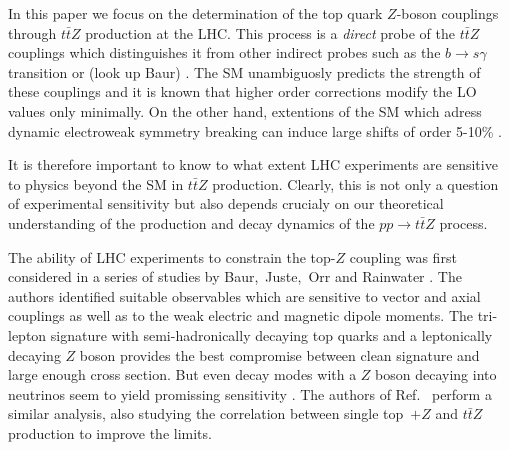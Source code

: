 \documentclass[preprint]{JHEP3} %
\def\ttbZ{t\bar{t}Z}
\begin{document}
In this paper we focus on the determination of the top quark $Z$-boson couplings through $\ttbZ$ production at the LHC. 
This process is a {\it direct} probe of the $\ttbZ$ couplings which distinguishes it from other indirect probes such as the $b \to s\gamma$ transition \cite{} 
or (look up Baur) \cite{}. 
The SM unambiguosly predicts the strength of these couplings and it is known that higher order corrections modify the LO values only minimally.
On the other hand, extentions of the SM which adress dynamic electroweak symmetry breaking can induce large shifts of order 5-10\% \cite{see-inside-LMMP}.

% 

It is therefore important to know to what extent LHC experiments are sensitive to physics beyond the SM in $\ttbZ$ production.
Clearly, this is not only a question of experimental sensitivity but also depends crucialy on our theoretical understanding of the production and decay dynamics 
of the $pp\to\ttbZ$ process.

The ability of LHC experiments to constrain the top-$Z$ coupling was first considered in a series of studies by Baur,~Juste,~Orr and Rainwater \cite{Baur:2004uw,Baur:2005wi,one more Baur paper}. 
The authors identified suitable observables which are sensitive to vector and axial couplings as well as to the weak electric and magnetic dipole moments.
The tri-lepton signature with semi-hadronically decaying top quarks and a leptonically decaying $Z$ boson provides the best compromise between
clean signature and large enough cross section. 
But even decay modes with a $Z$ boson decaying into neutrinos seem to yield promissing sensitivity \cite{Baur:2005wi}.
The authors of Ref.~\cite{Berger:2009hi} perform a similar analysis, also studying the correlation between single top~$+Z$ and $\ttbZ$ production to improve the limits.
\end{document}
